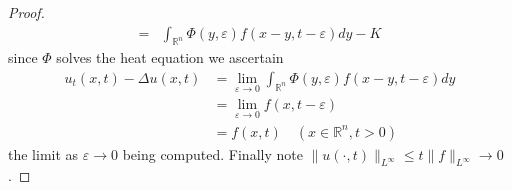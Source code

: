 \begin{theorem}
\begin{proof}
\begin{equation*}
\begin{aligned}
                =                & \int_{\mathbb{R}^n} \Phi(y, \varepsilon) f(x-y, t-\varepsilon) d y-K
            \end{aligned}
        \end{equation*}
        since $\Phi$ solves the heat equation we ascertain
        \begin{equation*}
            \begin{aligned}
                u_t(x, t)-\Delta u(x, t) & =\lim _{\varepsilon \rightarrow 0} \int_{\mathbb{R}^n} \Phi(y, \varepsilon) f(x-y, t-\varepsilon) d y \\
                                         & = \lim _{\varepsilon \rightarrow 0} f(x,t-\varepsilon)                                                \\
                                         & = f(x, t) \quad\left(x \in \mathbb{R}^n, t>0\right)
            \end{aligned}
        \end{equation*}
        the limit as $\varepsilon \rightarrow 0$ being computed. Finally note $\|u(\cdot, t)\|_{L^{\infty}} \leq t\|f\|_{L^{\infty}} \rightarrow 0$.
    \end{proof}
\end{theorem}


